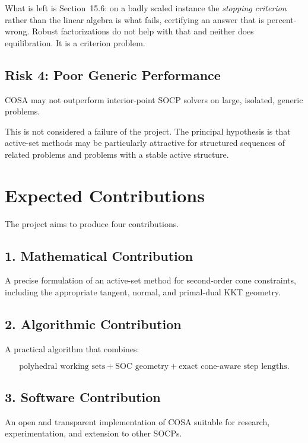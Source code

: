 \documentclass[11pt,a4paper]{article}
\begin{document}
What is left is Section~15.6: on a badly scaled instance the
\emph{stopping criterion} rather than the linear algebra is what
fails, certifying an answer that is percent-wrong. Robust
factorizations do not help with that and neither does equilibration.
It is a criterion problem.

\subsection{Risk 4: Poor Generic Performance}

COSA may not outperform interior-point SOCP solvers on large,
isolated, generic problems.

This is not considered a failure of the project. The principal
hypothesis is that active-set methods may be particularly attractive
for structured sequences of related problems and problems with a
stable active structure.

\section{Expected Contributions}

The project aims to produce four contributions.

\subsection{1. Mathematical Contribution}

A precise formulation of an active-set method for second-order cone
constraints, including the appropriate tangent, normal, and
primal-dual KKT geometry.

\subsection{2. Algorithmic Contribution}

A practical algorithm that combines:

\[
\text{polyhedral working sets}
+
\text{SOC geometry}
+
\text{exact cone-aware step lengths}.
\]

\subsection{3. Software Contribution}

An open and transparent implementation of COSA suitable for research,
experimentation, and extension to other SOCPs.
\end{document}
